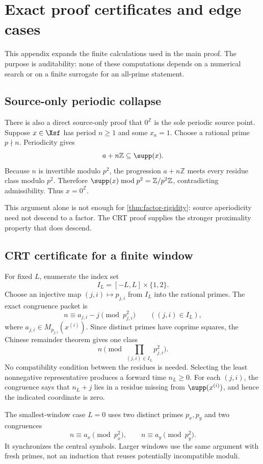 \section{Exact proof certificates and edge cases}
\label{app:proof-details}

This appendix expands the finite calculations used in the main proof.  The
purpose is auditability: none of these computations depends on a numerical
search or on a finite surrogate for an all-prime statement.

\subsection{Source-only periodic collapse}

There is also a direct source-only proof that \(0^{\mathbb Z}\) is the sole
periodic source point.  Suppose \(x\in\Xsf\) has period \(n\geq1\) and some
\(x_a=1\).  Choose a rational prime \(p\nmid n\).  Periodicity gives
\[
  a+n\mathbb Z\subseteq\supp(x).
\]
Because \(n\) is invertible modulo \(p^2\), the progression
\(a+n\mathbb Z\) meets every residue class modulo \(p^2\).  Therefore
\(\supp(x)\bmod p^2=\mathbb Z/p^2\mathbb Z\), contradicting admissibility.
Thus \(x=0^{\mathbb Z}\).

This argument alone is not enough for \cref{thm:factor-rigidity}: source
aperiodicity need not descend to a factor.  The CRT proof supplies the
stronger proximality property that does descend.

\subsection{CRT certificate for a finite window}

For fixed \(L\), enumerate the index set
\[
  I_L=[-L,L]\times\{1,2\}.
\]
Choose an injective map \((j,i)\mapsto p_{j,i}\) from \(I_L\) into the
rational primes.  The exact congruence packet is
\[
  n\equiv a_{j,i}-j\pmod{p_{j,i}^2}
  \qquad((j,i)\in I_L),
\]
where \(a_{j,i}\in M_{p_{j,i}}(x^{(i)})\).  Since distinct primes have
coprime squares, the Chinese remainder theorem gives one class
\[
  n\pmod{\prod_{(j,i)\in I_L}p_{j,i}^2}.
\]
No compatibility condition between the residues is needed.  Selecting the
least nonnegative representative produces a forward time \(n_L\geq0\).
For each \((j,i)\), the congruence says that \(n_L+j\) lies in a residue
missing from \(\supp(x^{(i)})\), and hence the indicated coordinate is zero.

The smallest-window case \(L=0\) uses two distinct primes \(p_x,p_y\) and
two congruences
\[
  n\equiv a_x\pmod{p_x^2},
  \qquad
  n\equiv a_y\pmod{p_y^2}.
\]
It synchronizes the central symbols.  Larger windows use the same argument
with fresh primes, not an induction that reuses potentially incompatible
moduli.


